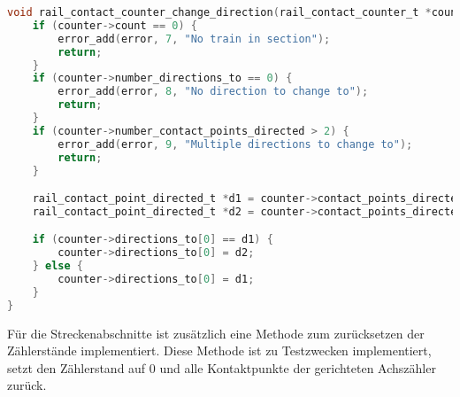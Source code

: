 \begin{margin}
    \begin{lstlisting}[caption={Methoden der Achszähler},label={lst:Methoden},language=C]
void rail_contact_counter_change_direction(rail_contact_counter_t *counter, error_t *error) {
    if (counter->count == 0) {
        error_add(error, 7, "No train in section");
        return;
    }
    if (counter->number_directions_to == 0) {
        error_add(error, 8, "No direction to change to");
        return;
    }
    if (counter->number_contact_points_directed > 2) {
        error_add(error, 9, "Multiple directions to change to");
        return;
    }

    rail_contact_point_directed_t *d1 = counter->contact_points_directed[0];
    rail_contact_point_directed_t *d2 = counter->contact_points_directed[1];

    if (counter->directions_to[0] == d1) {
        counter->directions_to[0] = d2;
    } else {
        counter->directions_to[0] = d1;
    }
}
    \end{lstlisting}
\end{margin}

Für die Streckenabschnitte ist zusätzlich eine Methode zum zurücksetzen der Zählerstände implementiert. Diese Methode ist zu Testzwecken implementiert, setzt den Zählerstand auf 0 und alle Kontaktpunkte der gerichteten Achszähler zurück.


